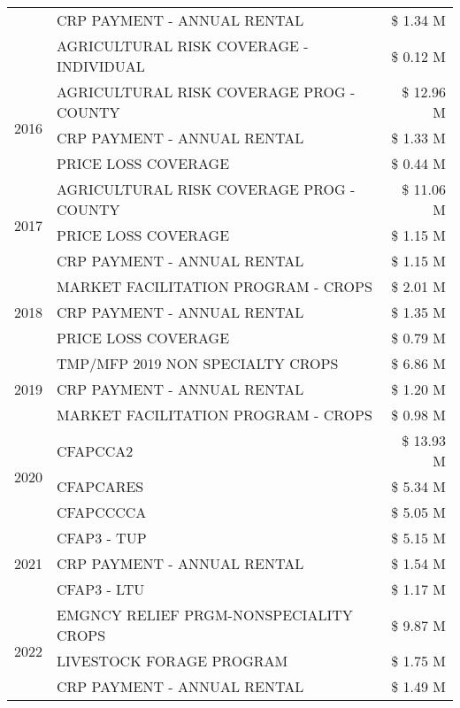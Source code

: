 \begin{tabular}{llr}
 & CRP PAYMENT - ANNUAL RENTAL & \$ 1.34 M \\
 & AGRICULTURAL RISK COVERAGE - INDIVIDUAL & \$ 0.12 M \\
\cline{1-3}
\multirow[t]{3}{*}{2016} & AGRICULTURAL RISK COVERAGE PROG - COUNTY & \$ 12.96 M \\
 & CRP PAYMENT - ANNUAL RENTAL & \$ 1.33 M \\
 & PRICE LOSS COVERAGE & \$ 0.44 M \\
\cline{1-3}
\multirow[t]{3}{*}{2017} & AGRICULTURAL RISK COVERAGE PROG - COUNTY & \$ 11.06 M \\
 & PRICE LOSS COVERAGE & \$ 1.15 M \\
 & CRP PAYMENT - ANNUAL RENTAL & \$ 1.15 M \\
\cline{1-3}
\multirow[t]{3}{*}{2018} & MARKET FACILITATION PROGRAM - CROPS & \$ 2.01 M \\
 & CRP PAYMENT - ANNUAL RENTAL & \$ 1.35 M \\
 & PRICE LOSS COVERAGE & \$ 0.79 M \\
\cline{1-3}
\multirow[t]{3}{*}{2019} & TMP/MFP 2019 NON SPECIALTY CROPS & \$ 6.86 M \\
 & CRP PAYMENT - ANNUAL RENTAL & \$ 1.20 M \\
 & MARKET FACILITATION PROGRAM - CROPS & \$ 0.98 M \\
\cline{1-3}
\multirow[t]{3}{*}{2020} & CFAPCCA2 & \$ 13.93 M \\
 & CFAPCARES & \$ 5.34 M \\
 & CFAPCCCCA & \$ 5.05 M \\
\cline{1-3}
\multirow[t]{3}{*}{2021} & CFAP3 - TUP & \$ 5.15 M \\
 & CRP PAYMENT - ANNUAL RENTAL & \$ 1.54 M \\
 & CFAP3 - LTU & \$ 1.17 M \\
\cline{1-3}
\multirow[t]{3}{*}{2022} & EMGNCY RELIEF PRGM-NONSPECIALITY CROPS & \$ 9.87 M \\
 & LIVESTOCK FORAGE PROGRAM & \$ 1.75 M \\
 & CRP PAYMENT - ANNUAL RENTAL & \$ 1.49 M \\
\cline{1-3}
\bottomrule
\end{tabular}
